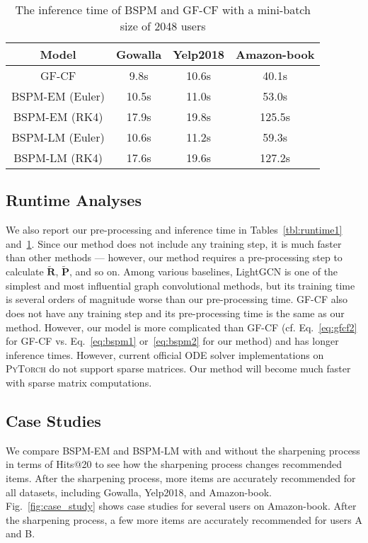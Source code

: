 \documentclass[sigconf,natbib=true]{acmart}
\begin{document}
\begin{table}[t]
    \small
\centering
    \caption{The inference time of BSPM and GF-CF with a mini-batch size of 2048 users}
    \begin{tabular}{c c c c}\toprule
        Model  & Gowalla & Yelp2018 & Amazon-book \\
        \midrule
GF-CF                   &   9.8s & 10.6s & 40.1s\\
        BSPM-EM (Euler)         &  10.5s & 11.0s & 53.0s\\
        BSPM-EM (RK4)           &  17.9s & 19.8s & 125.5s\\
        BSPM-LM (Euler)         &  10.6s & 11.2s & 59.3s\\
        BSPM-LM (RK4)           &  17.6s & 19.6s & 127.2s\\        
        \bottomrule
    \end{tabular}
    \label{tbl:runtime2}
\end{table}

\subsection{Runtime Analyses}
We also report our pre-processing and inference time in Tables~\ref{tbl:runtime1} and~\ref{tbl:runtime2}. Since our method does not include any training step, it is much faster than other methods --- however, our method requires a pre-processing step to calculate $\tilde{\bm{R}}$, $\tilde{\bm{P}}$, and so on. Among various baselines, LightGCN is one of the simplest and most influential graph convolutional methods, but its training time is several orders of magnitude worse than our pre-processing time. GF-CF also does not have any training step and its pre-processing time is the same as our method. However, our model is more complicated than GF-CF (cf. Eq.~\eqref{eq:gfcf2} for GF-CF vs. Eq.~\eqref{eq:bspm1} or~\eqref{eq:bspm2} for our method) and has longer inference times. However, current official ODE solver implementations on \textsc{PyTorch} do not support sparse matrices. Our method will become much faster with sparse matrix computations.

\subsection{Case Studies}\label{sec:case}
We compare BSPM-EM and BSPM-LM with and without the sharpening process in terms of Hits@20 to see how the sharpening process changes recommended items. After the sharpening process, more items are accurately recommended for all datasets, including Gowalla, Yelp2018, and Amazon-book. Fig.~\ref{fig:case_study} shows case studies for several users on Amazon-book. After the sharpening process, a few more items are accurately recommended for users A and B.
\end{document}
